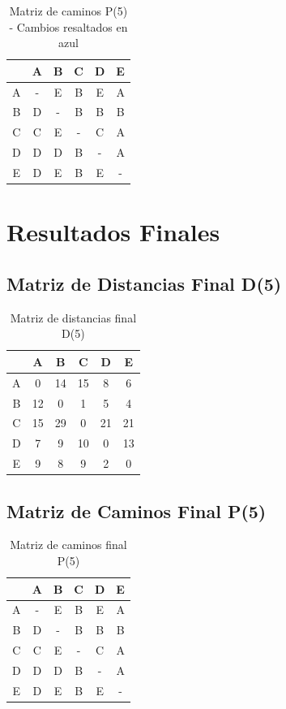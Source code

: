 \documentclass[12pt]{article}
\begin{document}
\begin{table}[h!]
\centering
\begin{tabular}{|c|c|c|c|c|c|}
\hline
 & A & B & C & D & E \\\hline
A & - & \cellcolor{lightblue} E & \cellcolor{lightblue} B & \cellcolor{lightblue} E & A \\\hline
B & D & - & B & B & B \\\hline
C & C & \cellcolor{lightblue} E & - & C & A \\\hline
D & D & D & B & - & A \\\hline
E & D & E & B & E & - \\\hline
\end{tabular}
\caption{Matriz de caminos P(5) - Cambios resaltados en azul}
\end{table}

\clearpage
\section{Resultados Finales}
\subsection{Matriz de Distancias Final D(5)}
\begin{table}[h!]
\centering
\begin{tabular}{|c|c|c|c|c|c|}
\hline
 & A & B & C & D & E \\\hline
A & 0 & 14 & 15 & 8 & 6 \\\hline
B & 12 & 0 & 1 & 5 & 4 \\\hline
C & 15 & 29 & 0 & 21 & 21 \\\hline
D & 7 & 9 & 10 & 0 & 13 \\\hline
E & 9 & 8 & 9 & 2 & 0 \\\hline
\end{tabular}
\caption{Matriz de distancias final D(5)}
\end{table}

\clearpage
\subsection{Matriz de Caminos Final P(5)}
\begin{table}[h!]
\centering
\begin{tabular}{|c|c|c|c|c|c|}
\hline
 & A & B & C & D & E \\\hline
A & - & E & B & E & A \\\hline
B & D & - & B & B & B \\\hline
C & C & E & - & C & A \\\hline
D & D & D & B & - & A \\\hline
E & D & E & B & E & - \\\hline
\end{tabular}
\caption{Matriz de caminos final P(5)}
\end{table}
\end{document}
